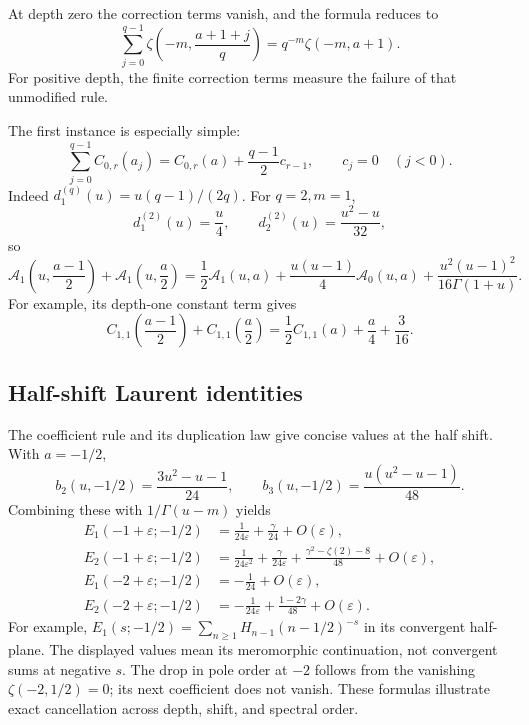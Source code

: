 At depth zero the correction terms vanish, and the formula reduces to
\[
 \sum_{j=0}^{q-1}
       \zeta\left(-m,\frac{a+1+j}{q}\right)
       =q^{-m}\zeta(-m,a+1).
\]
For positive depth, the finite correction terms measure the failure of
that unmodified rule.

The first instance is especially simple:
\begin{equation}\label{harm:eq:multiplicationzero}
 \sum_{j=0}^{q-1}C_{0,r}(a_j)
       =C_{0,r}(a)+\frac{q-1}{2}c_{r-1},
 \qquad c_j=0\quad(j<0).
\end{equation}
Indeed \(d_1^{(q)}(u)=u(q-1)/(2q)\). For \(q=2,m=1\),
\[
 d_1^{(2)}(u)=\frac u4,\qquad
 d_2^{(2)}(u)=\frac{u^2-u}{32},
\]
so
\begin{equation}\label{harm:eq:duplicationgerm}
 \mathcal A_1\left(u,\frac{a-1}{2}\right)
 +\mathcal A_1\left(u,\frac a2\right)
 =\frac12\mathcal A_1(u,a)
   +\frac{u(u-1)}4\mathcal A_0(u,a)
   +\frac{u^2(u-1)^2}{16\Gamma(1+u)}.
\end{equation}
For example, its depth-one constant term gives
\[
 C_{1,1}\left(\frac{a-1}{2}\right)
 +C_{1,1}\left(\frac a2\right)
 =\frac12C_{1,1}(a)+\frac a4+\frac3{16}.
\]

\subsection{Half-shift Laurent identities}

The coefficient rule and its duplication law give concise values at the
half shift. With \(a=-1/2\),
\[
 b_2(u,-1/2)=\frac{3u^2-u-1}{24},\qquad
 b_3(u,-1/2)=\frac{u(u^2-u-1)}{48}.
\]
Combining these with \(1/\Gamma(u-m)\) yields
\begin{align}
 E_1(-1+\varepsilon;-1/2)
  &=\frac{1}{24\varepsilon}+\frac{\gamma}{24}
       +O(\varepsilon),\label{harm:eq:half11}\\
 E_2(-1+\varepsilon;-1/2)
  &=\frac{1}{24\varepsilon^2}
      +\frac{\gamma}{24\varepsilon}
      +\frac{\gamma^2-\zeta(2)-8}{48}
       +O(\varepsilon),\label{harm:eq:half21}\\
 E_1(-2+\varepsilon;-1/2)
  &=-\frac1{24}+O(\varepsilon),\label{harm:eq:half12}\\
 E_2(-2+\varepsilon;-1/2)
  &=-\frac{1}{24\varepsilon}+\frac{1-2\gamma}{48}
       +O(\varepsilon).\label{harm:eq:half22}
\end{align}
For example, \(E_1(s;-1/2)=\sum_{n\geq1}H_{n-1}(n-1/2)^{-s}\)
in its convergent half-plane. The displayed values mean its
meromorphic continuation, not convergent sums at negative \(s\).
The drop in pole order at \(-2\) follows from the vanishing
\(\zeta(-2,1/2)=0\); its next coefficient does not vanish.
These formulas illustrate exact cancellation across depth, shift, and
spectral order.

